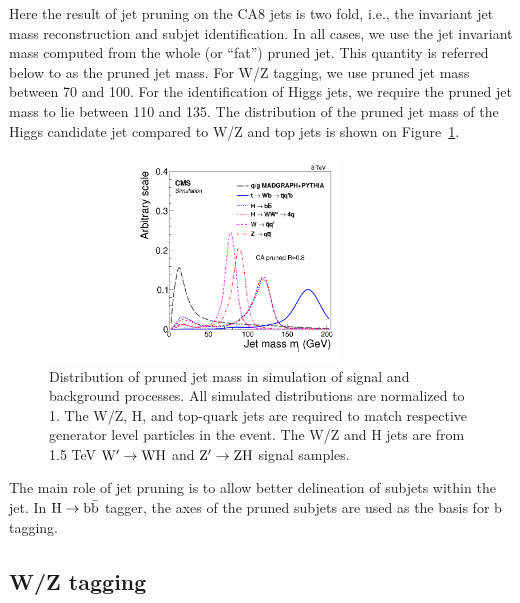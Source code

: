 Here the result of jet pruning on the CA8 jets is two fold, i.e., the invariant jet mass 
reconstruction and subjet identification.
In all cases,
we use the jet invariant mass computed from the whole (or ``fat'') 
pruned jet.  This quantity is referred below to as the pruned jet mass.
For W/Z tagging, we use pruned jet mass between 70 and 100\GeVcc. 
For the identification of Higgs jets, we require the pruned jet mass to
lie between 110 and 135\GeVcc.  The distribution of the pruned jet
mass of the Higgs candidate jet 
compared to W/Z and top jets is shown on Figure~\ref{fig:JetMassTagging}. 


\begin{figure}[htb]
\begin{center}
\includegraphics[width=0.69\textwidth]{EXO-14-009/HbbZqqfigs/Signal/signal-data-qcd-jetmass.pdf}
\end{center}
\caption{
Distribution of pruned jet mass in simulation of signal and background processes. All simulated distributions are normalized to 1. The W/Z, H, and top-quark jets are required to match respective generator level particles in the event. The W/Z and H jets are from 
1.5 TeV ${\rm W' \to WH}$ and ${\rm Z' \to ZH}$ signal samples. 
} 
\label{fig:JetMassTagging}
\end{figure}


The main role of jet pruning is to allow better delineation of subjets
within the jet.  In ${\rm H \to b\bar{b}}$ tagger, the axes of the 
pruned subjets are used as the basis for b tagging.



\subsection{W/Z tagging  } 
\label{sec:wztagging}

